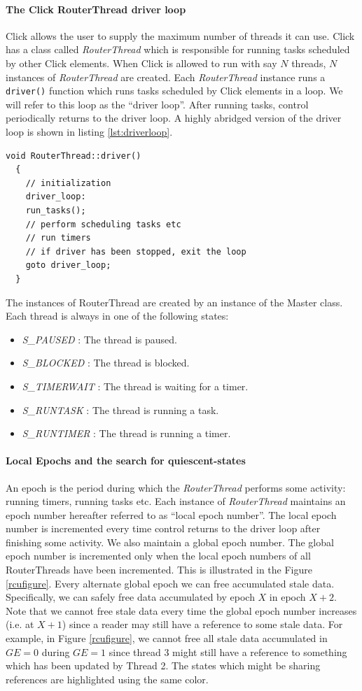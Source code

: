 \documentclass[12pt,a4paper]{article}
\begin{document}
\paragraph{The Click RouterThread driver loop}
Click allows the user to supply the maximum number of threads it can use. Click has a class called \emph{RouterThread} which is responsible for running tasks scheduled by other Click elements. When Click is allowed to run with say $N$ threads, $N$ instances of \emph{RouterThread} are created. Each \emph{RouterThread} instance runs a \verb+driver()+ function which runs tasks scheduled by Click elements in a loop. We will refer to this loop as the ``driver loop''. After running tasks, control periodically returns to the driver loop. A highly abridged version of the driver loop is shown in listing \ref{lst:driverloop}.
\begin{lstlisting}[caption = Pseudocode for the driver loop, label=lst:driverloop]
  void RouterThread::driver()
  {
    // initialization 
    driver_loop:
    run_tasks();
    // perform scheduling tasks etc
    // run timers
    // if driver has been stopped, exit the loop
    goto driver_loop;
  }
\end{lstlisting}
The instances of RouterThread are created by an instance of the Master class. Each thread is always in one of the following states:
\begin{itemize}
\item \emph{S\_PAUSED} : The thread is paused.
\item \emph{S\_BLOCKED} : The thread is blocked.
\item \emph{S\_TIMERWAIT} : The thread is waiting for a timer.
\item \emph{S\_RUNTASK} : The thread is running a task.
\item \emph{S\_RUNTIMER} : The thread is running a timer.
\end{itemize}
\paragraph{Local Epochs and the search for quiescent-states}
An epoch is the period during which the \emph{RouterThread} performs some activity: running timers, running tasks etc. Each instance of \emph{RouterThread} maintains an epoch number hereafter referred to as ``local epoch number''. The local epoch number is incremented every time control returns to the driver loop after finishing some activity. We also maintain a global epoch number. The global epoch number is incremented only when the local epoch numbers of all RouterThreads have been incremented. This is illustrated in the Figure \ref{rcufigure}. Every alternate global epoch we can free accumulated stale data. Specifically, we can safely free data accumulated by epoch $X$ in epoch $X+2$. Note that we cannot free stale data every time the global epoch number increases (i.e. at $X+1$) since a reader may still have a reference to some stale data. For example, in Figure \ref{rcufigure}, we cannot free all stale data accumulated in $GE=0$ during $GE=1$ since thread 3 might still have a reference to something which has been updated by Thread 2. The states which might be sharing references are highlighted using the same color.
\end{document}
